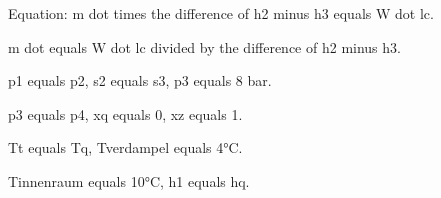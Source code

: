 Equation: m dot times the difference of h2 minus h3 equals W dot lc.

m dot equals W dot lc divided by the difference of h2 minus h3.

p1 equals p2, s2 equals s3, p3 equals 8 bar.

p3 equals p4, xq equals 0, xz equals 1.

Tt equals Tq, Tverdampel equals 4°C.

Tinnenraum equals 10°C, h1 equals hq.